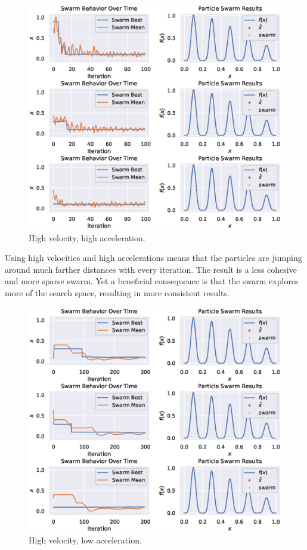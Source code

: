 \documentclass[12pt]{article}
\begin{document}
\begin{figure}[H]
    \centering
    \includegraphics[width=\textwidth]{figures/pso-high-vel-high-accel.eps}
    \caption{High velocity, high acceleration.}\label{fig:pso:high-vel-high-accel}
\end{figure}

Using high velocities and high accelerations means that the particles are jumping around much farther distances with every iteration.
The result is a less cohesive and more sparse swarm.
Yet a beneficial consequence is that the swarm explores more of the search space, resulting in more consistent results.

\begin{figure}[H]
    \centering
    \includegraphics[width=\textwidth]{figures/pso-high-vel-low-accel.eps}
    \caption{High velocity, low acceleration.}\label{fig:pso:high-vel-low-accel}
\end{figure}
\end{document}

